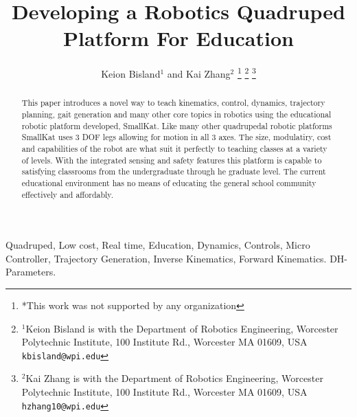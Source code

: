 \documentclass[conference]{IEEEtran}
\title{\LARGE \bf
Developing a Robotics Quadruped Platform For Education}
\author{Keion Bisland$^{1}$ and Kai Zhang$^{2}$%
\thanks{*This work was not supported by any organization}%
\thanks{$^{1}$Keion Bisland is with the Department of Robotics Engineering,
        Worcester Polytechnic Institute, 100 Institute Rd., Worcester MA 01609, USA
        {\tt\small kbisland@wpi.edu}}%
\thanks{$^{2}$Kai Zhang is with the Department of Robotics Engineering,
        Worcester Polytechnic Institute, 100 Institute Rd., Worcester MA 01609, USA
        {\tt\small hzhang10@wpi.edu}}%
}
\begin{document}
\maketitle
\thispagestyle{empty}
\pagestyle{plain}

\begin{abstract}
	This paper introduces a novel way to teach kinematics, control, dynamics, trajectory planning, gait generation and many other core topics in robotics using the educational robotic platform developed, SmallKat. Like many other quadrupedal robotic platforms SmallKat uses 3 DOF legs allowing for motion in all 3 axes. The size, modulatiry, cost and capabilities of the robot are what suit it perfectly to teaching classes at a variety of levels. With the integrated sensing and safety features this platform is capable to satisfying classrooms from the undergraduate through he graduate level. The current educational environment has no means of educating the general school community effectively and affordably.
	\newline

\end{abstract}

\begin{IEEEkeywords}

    Quadruped, Low cost, Real time, Education, Dynamics, Controls, Micro Controller, Trajectory Generation, Inverse Kinematics, Forward Kinematics. DH-Parameters. 

\end{IEEEkeywords}

\end{document}
